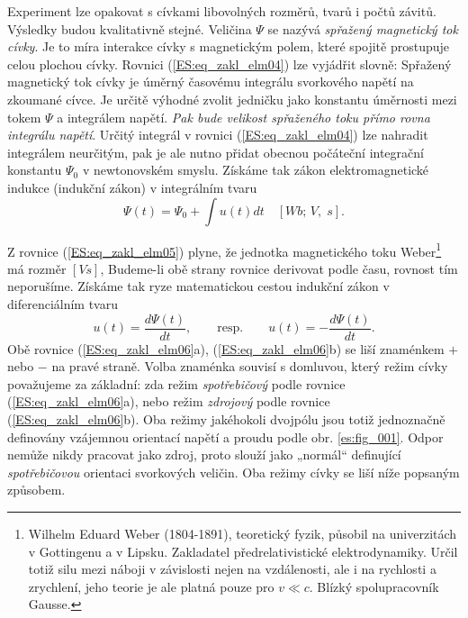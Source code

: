       Experiment lze opakovat s cívkami libovolných rozměrů, tvarů i počtů závitů. Výsledky budou
      kvalitativně stejné. Veličina \(\Psi\) se nazývá \emph{spřažený magnetický tok cívky}. Je to 
      míra interakce cívky s magnetickým polem, které spojitě prostupuje celou plochou cívky. 
      Rovnici (\ref{ES:eq_zakl_elm04}) lze vyjádřit slovně: Spřažený magnetický tok cívky je úměrný 
      časovému integrálu svorkového napětí na zkoumané cívce. Je určitě výhodné zvolit jedničku 
      jako konstantu úměrnosti mezi tokem \(\Psi\) a integrálem napětí. \emph{Pak bude velikost 
      spřaženého toku přímo rovna integrálu napětí}. Určitý integrál v rovnici 
      (\ref{ES:eq_zakl_elm04}) lze nahradit integrálem neurčitým, pak je ale nutno přidat obecnou 
      počáteční integrační konstantu \(\Psi_0\)
      v newtonovském smyslu. Získáme tak zákon elektromagnetické indukce (indukční zákon) v
      integrálním tvaru
      \begin{equation}\label{ES:eq_zakl_elm05}
       \Psi(t) = \Psi_0 + \int u(t)dt \quad [Wb;\, V,\; s].
      \end{equation}   
    
    Z rovnice (\ref{ES:eq_zakl_elm05}) plyne, že jednotka magnetického toku Weber\footnote{Wilhelm
    Eduard Weber (1804-1891), teoretický fyzik, působil na univerzitách v Gottingenu a v Lipsku.
    Zakladatel předrelativistické elektrodynamiky. Určil totiž silu mezi náboji v závislosti nejen
    na vzdálenosti, ale i na rychlosti a zrychlení, jeho teorie je ale platná pouze pro \(v \ll c\).
    Blízký spolupracovník Gausse.} má rozměr \([Vs]\), Budeme-li obě strany rovnice derivovat podle
    času, rovnost tím neporušíme. Získáme tak ryze matematickou cestou indukční zákon v
    diferenciálním tvaru
    \begin{equation}\label{ES:eq_zakl_elm06}
     u(t) = \frac{d\Psi(t)}{dt}, \qquad \text{resp.} \qquad  u(t) = -\frac{d\Psi(t)}{dt}.
    \end{equation}   
    Obě rovnice (\ref{ES:eq_zakl_elm06}a), (\ref{ES:eq_zakl_elm06}b) se liší znaménkem \(+\) nebo
    \(-\) na pravé straně. Volba znaménka souvisí s domluvou, který režim cívky považujeme za
    základní: zda režim \emph{spotřebičový} podle rovnice (\ref{ES:eq_zakl_elm06}a), nebo režim
    \emph{zdrojový} podle rovnice (\ref{ES:eq_zakl_elm06}b). Oba režimy jakéhokoli dvojpólu jsou
    totiž jednoznačně definovány vzájemnou orientací napětí a proudu podle obr.
    \ref{es:fig_001}. Odpor nemůže nikdy pracovat jako zdroj, proto slouží jako
    „normál“ definující \emph{spotřebičovou} orientaci svorkových veličin. Oba režimy cívky se liší
    níže popsaným způsobem.

